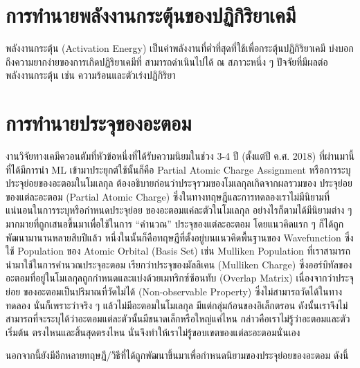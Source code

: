 \section{การทำนายพลังงานกระตุ้นของปฏิกิริยาเคมี}
\label{sec:pred_act_ener}

พลังงานกระตุ้น (Activation Energy) เป็นค่าพลังงานที่ต่ำที่สุดที่ใช้เพื่อกระตุ้นปฏิกิริยาเคมี บ่งบอกถึงความยากง่ายของการเกิดปฏิริยาเคมีที่%
สามารถดำเนินไปได้ ณ สภาวะหนึ่ง ๆ ปัจจัยที่มีผลต่อพลังงานกระตุ้น เช่น ความร้อนและตัวเร่งปฏิกิริยา

\section{การทำนายประจุของอะตอม}
\label{sec:pred_atomic_charge}

งานวิจัยทางเคมีควอนตัมที่หัวข้อหนึ่งที่ได้รับความนิยมในช่วง 3-4 ปี (ตั้งแต่ปี ค.ศ. 2018) ที่ผ่านมานี้ที่ได้มีการนำ ML เข้ามาประยุกต์ใช้นั้นก็คือ 
Partial Atomic Charge Assignment หรือการระบุประจุย่อยของอะตอมในโมเลกุล ต้องอธิบายก่อนว่าประจุรวมของโมเลกุลเกิดจากผลรวมของ%
ประจุย่อยของแต่ละอะตอม (Partial Atomic Charge) ซึ่งในทางทฤษฎีและการทดลองเราไม่มีนิยามที่แน่นอนในการระบุหรือกำหนดประจุย่อย%
ของอะตอมแค่ละตัวในโมเลกุล อย่างไรก็ตามได้มีนิยามต่าง ๆ มากมายที่ถูกเสนอขึ้นมาเพื่อใช้ในการ \enquote{คำนวณ} ประจุของแต่ละอะตอม 
โดยแนวคิดแรก ๆ ก็ได้ถูกพัฒนามานานหลายสิบปีแล้ว หนึ่งในนั้นก็คือทฤษฎีที่ตั้งอยู่บนแนวคิดพื้นฐานของ Wavefunction ซึ่งใช้ Population 
ของ Atomic Orbital (Basis Set) เช่น Mulliken Population ที่เราสามารถนำมาใช้ในการคำนวณประจุอะตอม เรียกว่าประจุของมัลลิเคน 
(Mulliken Charge) ซึ่งออร์บิทัลของอะตอมที่อยู่ในโมเลกุลถูกกำหนดและแบ่งด้วยเมทริกซ์ซ้อนทับ (Overlap Matrix) เนื่องจากว่าประจุย่อย%
ของอะตอมเป็นปริมาณที่วัดไม่ได้ (Non-observable Property) ซึ่งไม่สามารถวัดได้ในทางทดลอง นั่นก็เพราะว่าจริง ๆ แล้วไม่มีอะตอมในโมเลกุล 
มีแต่กลุ่มก้อนของอิเล็กตรอน ดังนั้นเราจึงไม่สามารถที่จะระบุได้ว่าอะตอมแต่ละตัวนั้นมีขนาดเล็กหรือใหญ่แค่ไหน กล่าวคือเราไม่รู้ว่าอะตอมและตัวเริ่มต้น%
ตรงไหนและสิ้นสุดตรงไหน นั่นจึงทำให้เราไม่รู้ขอบเขตของแต่ละอะตอมนั่นเอง

นอกจากนี้ยังมีอีกหลายทฤษฎี/วิธีที่ได้ถูกพัฒนาขึ้นมาเพื่อกำหนดนิยามของประจุย่อยของอะตอม ดังนี้

